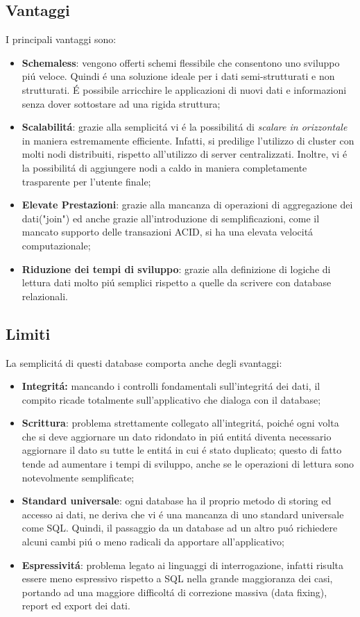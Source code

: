 \subsection{Vantaggi}
I principali vantaggi sono:
\begin{itemize}
    \item \textbf{Schemaless}: vengono offerti schemi flessibile che consentono uno sviluppo piú veloce. Quindi é una soluzione ideale
    per i dati semi-strutturati e non strutturati. É possibile arricchire le applicazioni di nuovi dati e informazioni
    senza dover sottostare ad una rigida struttura;
    \item \textbf{Scalabilitá}: grazie alla semplicitá vi é la possibilitá di \emph{scalare in orizzontale} in maniera estremamente
    efficiente. Infatti, si predilige l'utilizzo di cluster con molti nodi distribuiti, rispetto all'utilizzo di server centralizzati.
    Inoltre, vi é la possibilitá di aggiungere nodi a caldo in maniera completamente trasparente per l'utente finale;
    \item \textbf{Elevate Prestazioni}: grazie alla mancanza di operazioni di aggregazione dei dati("join") ed anche grazie
    all'introduzione di semplificazioni, come il mancato supporto delle transazioni ACID, si ha una elevata velocitá computazionale;
    \item \textbf{Riduzione dei tempi di sviluppo}: grazie alla definizione di logiche di lettura dati molto piú semplici rispetto a quelle da scrivere con
    database relazionali.
\end{itemize}

\subsection{Limiti}
La semplicitá di questi database comporta anche degli svantaggi:
\begin{itemize}
    \item \textbf{Integritá:} mancando i controlli fondamentali sull'integritá dei dati, il compito ricade totalmente sull'applicativo che dialoga con il database;
    \item \textbf{Scrittura}: problema strettamente collegato all'integritá, poiché ogni volta che si deve aggiornare un dato ridondato in piú entitá diventa
    necessario aggiornare il dato su tutte le entitá in cui é stato duplicato; questo di fatto tende ad aumentare i tempi di sviluppo, anche se le operazioni
    di lettura sono notevolmente semplificate;
    \item \textbf{Standard universale}: ogni database ha il proprio metodo di storing ed accesso ai dati, ne deriva che vi é una mancanza di uno standard
    universale come SQL. Quindi, il passaggio da un database ad un altro puó richiedere alcuni cambi piú o meno radicali da apportare all'applicativo;
    \item \textbf{Espressivitá}: problema legato ai linguaggi di interrogazione, infatti risulta essere meno espressivo rispetto a SQL nella grande maggioranza dei
    casi, portando ad una maggiore difficoltá di correzione massiva (data fixing), report ed export dei dati.

\end{itemize}

